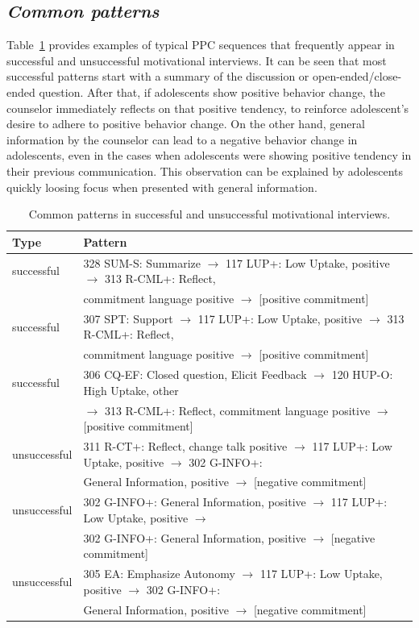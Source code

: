\documentclass{amia}
\begin{document}
\subsection*{\textit{Common patterns}}
Table~\ref{tab:common_patterns} provides examples of typical PPC sequences that frequently appear in successful and unsuccessful motivational interviews. It can be seen that most successful patterns start with a summary of the discussion or open-ended/close-ended question. After that, if adolescents show positive behavior change, the counselor immediately reflects on that positive tendency, to reinforce adolescent's desire to adhere to positive behavior change. On the other hand, general information by the counselor can lead to a negative behavior change in adolescents, even in the cases when adolescents were showing positive tendency in their previous communication. This observation can be explained by adolescents quickly loosing focus when presented with general information. \\

\begin{table}[h]
\centering
\caption{Common patterns in successful and unsuccessful motivational interviews.}
\label{tab:common_patterns}
  \begin{tabular}{|l|l|}
  \hline
   \textbf{Type} & \textbf{Pattern} \\ \hline      
successful & 328 SUM-S: Summarize $\rightarrow $ 117 LUP+: Low Uptake, positive $\rightarrow $ 313 R-CML+: Reflect, \\ 
& commitment language positive $\rightarrow $ [positive commitment] \\\hline
successful & 307 SPT: Support $\rightarrow $ 117 LUP+: Low Uptake, positive $\rightarrow $ 313 R-CML+: Reflect, \\
& commitment language positive $\rightarrow $ [positive commitment] \\\hline
successful & 306 CQ-EF: Closed question, Elicit Feedback $\rightarrow $ 120 HUP-O: High Uptake, other \\
& $\rightarrow $ 313 R-CML+: Reflect, commitment language positive $\rightarrow $ [positive commitment] \\\hline
unsuccessful & 311 R-CT+: Reflect, change talk positive $\rightarrow $ 117 LUP+: Low Uptake, positive $\rightarrow $ 302 G-INFO+:  \\
& General Information, positive $\rightarrow $ [negative commitment] \\\hline
unsuccessful & 302 G-INFO+: General Information, positive $\rightarrow $ 117 LUP+: Low Uptake, positive $\rightarrow $  \\
& 302 G-INFO+: General Information, positive $\rightarrow $ [negative commitment] \\\hline
unsuccessful & 305 EA: Emphasize Autonomy $\rightarrow $ 117 LUP+: Low Uptake, positive $\rightarrow $ 302 G-INFO+:  \\
& General Information, positive $\rightarrow $ [negative commitment] \\\hline
  \end{tabular}
\end{table} 
\end{document}

